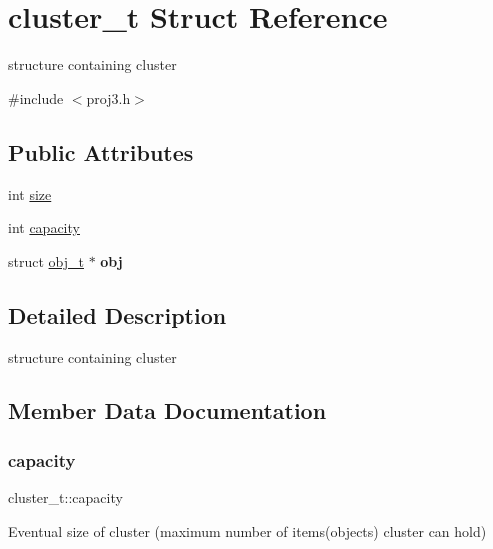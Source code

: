 \hypertarget{structcluster__t}{}\section{cluster\+\_\+t Struct Reference}
\label{structcluster__t}


structure containing cluster  




{\ttfamily \#include $<$proj3.\+h$>$}

\subsection*{Public Attributes}
\begin{DoxyCompactItemize}
\item 
int \mbox{\hyperlink{structcluster__t_a4e4495e72d3e816284bf2cad02ac4e3e}{size}}
\item 
int \mbox{\hyperlink{structcluster__t_a7e3f71983c260fc5fc6b2a721b872df9}{capacity}}
\item 
\mbox{\label{structcluster__t_a30eaceafae29d1a5b6f0fca36562c473}} 
struct \mbox{\hyperlink{structobj__t}{obj\+\_\+t}} $\ast$ {\bfseries obj}
\end{DoxyCompactItemize}


\subsection{Detailed Description}
structure containing cluster 

\subsection{Member Data Documentation}
\mbox{\label{structcluster__t_a7e3f71983c260fc5fc6b2a721b872df9}} 
\subsubsection{\texorpdfstring{capacity}{capacity}}
{\footnotesize\ttfamily cluster\+\_\+t\+::capacity}

Eventual size of cluster (maximum number of items(objects) cluster can hold) \mbox{\label{structcluster__t_a4e4495e72d3e816284bf2cad02ac4e3e}} 

